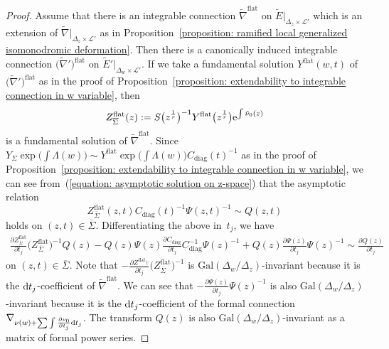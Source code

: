 \documentclass[pdftex]{sigma}
\numberwithin{equation}{section}
\begin{document}
\begin{proof}Assume that there is an integrable connection
$\tilde{\nabla}^{\mathrm{flat}}$ on $\tilde{E}|_{\Delta_z\times{\mathcal L'}}$
which is an extension of $\tilde{\nabla}|_{\Delta_z\times{\mathcal L'}}$
as in Proposition~\ref{proposition: ramified local generalized isomonodromic deformation}.
Then there is a canonically induced integrable connection
$\big(\tilde{\nabla}'\big)^{\mathrm{flat}}$ on $\tilde{E}'|_{\Delta_w\times{\mathcal L'}}$.
If we take a fundamental solution
$Y^{\mathrm{flat}}(w,t)$ of $\big(\tilde{\nabla}'\big)^{\mathrm{flat}}$ as in the proof of
Proposition~\ref{proposition: extendability to integrable connection in w variable},
then
\[
 Z^{\mathrm{flat}}_{\overline{\Sigma}}(z):=
 S\big(z^{\frac{1}{r}}\big)^{-1}Y^{\mathrm{flat}}\big(z^{\frac{1}{r}}\big){\rm e}^{\int\tilde{\nu}_0(z)}
\]
is a fundamental solution of $\tilde{\nabla}^{\mathrm{flat}}$.
Since
$Y_{\Sigma} \exp\big( \int\Lambda(w) \big)
\sim Y^{\mathrm{flat}} \exp\big( \int\Lambda(w) \big)
C_{\mathrm{diag}}(t)^{-1}$
as in the proof of Proposition~\ref{proposition: extendability to integrable connection in w variable},
we can see from~(\ref{equation: asymptotic solution on z-space})
that the asymptotic relation
\[
 Z^{\mathrm{flat}}_{\overline{\Sigma}}(z,t)
 C_{\mathrm{diag}}(t)^{-1}
 \Psi(z,t)^{-1}
 \sim Q(z,t)
\]
holds on $(z,t)\in \overline{\Sigma}$.
Differentiating the above in~$t_j$, we have
\begin{gather} \label{equation: differentiation of asymptotic on z-space}
 \frac{\partial Z^{\mathrm{flat}}_{\overline{\Sigma}}} {\partial t_j}
 \big(Z^{\mathrm{flat}}_{\overline{\Sigma}}\big)^{-1} Q(z)
 -Q(z)\Psi(z)
 \frac {\partial C_{\mathrm{diag}}} {\partial t_j}
 C_{\mathrm{diag}}^{-1} \Psi(z)^{-1}
 +Q(z) \frac{\partial \Psi(z)} {\partial t_j} \Psi(z)^{-1}
 \sim
 \frac{\partial Q(z)}{\partial t_j}
\end{gather}
on $(z,t)\in \overline{\Sigma}$.
Note that
$-\frac{\partial Z^{\mathrm{flat}_{\overline{\Sigma}}}} {\partial t_j }
\big(Z^{\mathrm{flat}}_{\overline{\Sigma}}\big)^{-1}$
is $\mathrm{Gal}(\Delta_w/\Delta_z)$-invariant
because it is the ${\rm d}t_j$-co\-ef\-fi\-cient of $\tilde{\nabla}^{\mathrm{flat}}$.
We can see that
$-\frac {\partial \Psi(z)} {\partial t_j} \Psi(z)^{-1}$ is also
$\mathrm{Gal}(\Delta_w/\Delta_z)$-invariant
because it is the ${\rm d}t_j$-coefficient of the formal connection
$\nabla_{\nu(w)+\sum\int\frac{\partial \nu_0}{\partial t_j}{\rm d}t_j}$.
The transform $Q(z)$ is also $\mathrm{Gal}(\Delta_w/\Delta_z)$-invariant
as a matrix of formal power series.

\end{proof}
\end{document}

